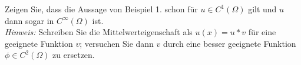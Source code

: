 
\begin{exercise}

Zeigen Sie, dass die Aussage von Beispiel 1. schon für $u \in C^1(\Omega)$ gilt und $u$ dann sogar in $C^\infty(\Omega)$ ist. \\
\textit{Hinweis:}
Schreiben Sie die Mittelwerteigenschaft als $u(x) = u \ast v$ für eine geeignete Funktion $v$;
versuchen Sie dann $v$ durch eine besser geeignete Funktion $\phi \in C^2(\Omega)$ zu ersetzen.

\end{exercise}


\begin{solution}




\end{solution}

